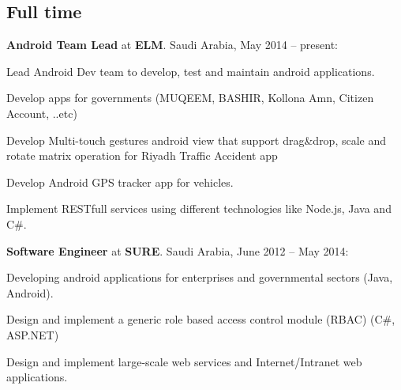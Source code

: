 \documentclass[letterpaper]{article}
\renewenvironment{itemize}{
  \begin{list}{}{
    \setlength{\leftmargin}{1.5em}
  }
}{
  \end{list}
}
\begin{document}
\subsection*{Full time}
\begin{itemize}

\item \textbf{Android Team Lead} at \textbf{ELM}.  Saudi Arabia, May 2014 -- present:
\begin{itemize}
\item Lead Android Dev team to develop, test and maintain android applications.
\item Develop apps for governments (MUQEEM, BASHIR, Kollona Amn, Citizen Account, ..etc)
\item Develop Multi-touch gestures android view that support drag\&drop, scale and rotate matrix operation for Riyadh Traffic Accident app
\item Develop Android GPS tracker app for vehicles.
\item Implement RESTfull services using different technologies like Node.js, Java and C\#.
\end{itemize}

\item \textbf{Software Engineer} at \textbf{SURE}.  Saudi Arabia, June 2012 -- May 2014:
\begin{itemize}
\item Developing android applications for enterprises and governmental sectors (Java, Android).
\item Design and implement a generic role based access control module (RBAC) (C\#, ASP.NET)
\item Design and implement large-scale web services and Internet/Intranet web applications.
\end{itemize}


\end{itemize}
\end{document}
